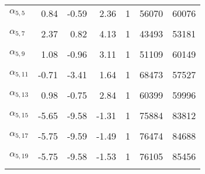 \begin{longtable}[t]{lrrrrrr}
$\alpha_{5, 5}$ & 0.84 & -0.59 & 2.36 & 1 & 56070 & 60076\\
\cellcolor{gray!6}{$\alpha_{5, 6}$} & \cellcolor{gray!6}{-5.89} & \cellcolor{gray!6}{-9.59} & \cellcolor{gray!6}{-1.77} & \cellcolor{gray!6}{1} & \cellcolor{gray!6}{75162} & \cellcolor{gray!6}{83326}\\
$\alpha_{5, 7}$ & 2.37 & 0.82 & 4.13 & 1 & 43493 & 53181\\
\cellcolor{gray!6}{$\alpha_{5, 8}$} & \cellcolor{gray!6}{1.62} & \cellcolor{gray!6}{0.19} & \cellcolor{gray!6}{3.13} & \cellcolor{gray!6}{1} & \cellcolor{gray!6}{44057} & \cellcolor{gray!6}{57321}\\
$\alpha_{5, 9}$ & 1.08 & -0.96 & 3.11 & 1 & 51109 & 60149\\
\cellcolor{gray!6}{$\alpha_{5, 10}$} & \cellcolor{gray!6}{5.66} & \cellcolor{gray!6}{1.19} & \cellcolor{gray!6}{9.59} & \cellcolor{gray!6}{1} & \cellcolor{gray!6}{72106} & \cellcolor{gray!6}{78728}\\
$\alpha_{5, 11}$ & -0.71 & -3.41 & 1.64 & 1 & 68473 & 57527\\
\cellcolor{gray!6}{$\alpha_{5, 12}$} & \cellcolor{gray!6}{2.67} & \cellcolor{gray!6}{0.68} & \cellcolor{gray!6}{5.22} & \cellcolor{gray!6}{1} & \cellcolor{gray!6}{58729} & \cellcolor{gray!6}{52116}\\
$\alpha_{5, 13}$ & 0.98 & -0.75 & 2.84 & 1 & 60399 & 59996\\
\cellcolor{gray!6}{$\alpha_{5, 14}$} & \cellcolor{gray!6}{1.27} & \cellcolor{gray!6}{-0.32} & \cellcolor{gray!6}{3.03} & \cellcolor{gray!6}{1} & \cellcolor{gray!6}{60651} & \cellcolor{gray!6}{61698}\\
$\alpha_{5, 15}$ & -5.65 & -9.58 & -1.31 & 1 & 75884 & 83812\\
\cellcolor{gray!6}{$\alpha_{5, 16}$} & \cellcolor{gray!6}{6.12} & \cellcolor{gray!6}{2.16} & \cellcolor{gray!6}{9.62} & \cellcolor{gray!6}{1} & \cellcolor{gray!6}{73821} & \cellcolor{gray!6}{82000}\\
$\alpha_{5, 17}$ & -5.75 & -9.59 & -1.49 & 1 & 76474 & 84688\\
\cellcolor{gray!6}{$\alpha_{5, 18}$} & \cellcolor{gray!6}{-0.42} & \cellcolor{gray!6}{-2.12} & \cellcolor{gray!6}{1.16} & \cellcolor{gray!6}{1} & \cellcolor{gray!6}{68624} & \cellcolor{gray!6}{62312}\\
$\alpha_{5, 19}$ & -5.75 & -9.58 & -1.53 & 1 & 76105 & 85456\\
\cellcolor{gray!6}{$\alpha_{5, 20}$} & \cellcolor{gray!6}{0.47} & \cellcolor{gray!6}{-1.06} & \cellcolor{gray!6}{2.03} & \cellcolor{gray!6}{1} & \cellcolor{gray!6}{68503} & \cellcolor{gray!6}{66647}\\

\end{longtable}
